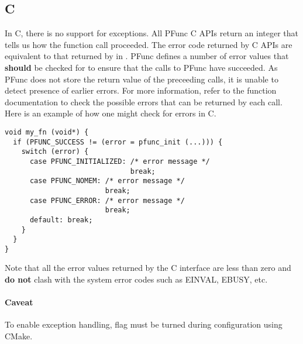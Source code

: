 \subsection{C}
In C, there is no support for exceptions. All PFunc C APIs return an integer
that tells us how the function call proceeded. The error code returned by C
APIs are equivalent to that returned by  in
\Cpp{}.  PFunc defines a number of error values that \textbf{should} be checked
for to ensure that the calls to PFunc have succeeded. As PFunc does not store
the return value of the preceeding calls, it is unable to detect presence of
earlier errors. For more information, refer to the function documentation to
check the possible errors that can be returned by each call.  Here is an
example of how one might check for errors in C.
%
\begin{lstlisting}
void my_fn (void*) {
  if (PFUNC_SUCCESS != (error = pfunc_init (...))) {
    switch (error) {
      case PFUNC_INITIALIZED: /* error message */
                              break;
      case PFUNC_NOMEM: /* error message */
                        break; 
      case PFUNC_ERROR: /* error message */
                        break;
      default: break;                  
    }
  }
}
\end{lstlisting}

%
Note that all the error values returned by the C interface are less than zero
and \textbf{do not} clash with the system error codes such as EINVAL, EBUSY,
etc.  

\paragraph{Caveat} To enable exception handling,  flag
must be turned  during configuration using CMake.
